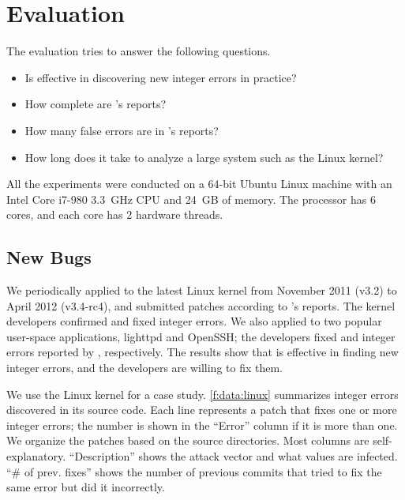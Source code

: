 \section{Evaluation}
\label{s:eval}

The evaluation tries to answer the following questions.
\begin{itemize}
\item
Is \sys effective in discovering new integer errors in practice?
\item
How complete are \sys's reports?
\item
How many false errors are in \sys's reports?
\item
How long does it take \sys to analyze a large system such
as the Linux kernel?
\end{itemize}

All the experiments were conducted on a 64-bit Ubuntu Linux machine
with an Intel Core i7-980 3.3~GHz CPU and 24~GB of memory.  The
processor has 6 cores, and each core has 2 hardware threads.

\subsection{New Bugs}
\label{s:eval:linux}

We periodically applied \sys to the latest Linux kernel
from November 2011 (v3.2) to April 2012 (v3.4-rc4),
and submitted patches according to \sys's reports.
The kernel developers confirmed and fixed \nrbugslinux integer errors.
%
We also applied \sys to two popular user-space applications, lighttpd
and OpenSSH; the developers fixed \nrbugslighttpd and \nrbugsopenssh
integer errors reported by \sys, respectively.
%
The results show that \sys is effective in finding new integer
errors, and the developers are willing to fix them.

We use the Linux kernel for a case study.  \autoref{f:data:linux}
summarizes integer errors \sys discovered in its source code.
Each line represents a patch that fixes one or more integer errors; the
number is shown in the ``Error'' column if it is more than one.  We
organize the patches based on the source directories.  Most
columns are self-explanatory.  ``Description'' shows the attack
vector and what values are infected.  ``\# of prev. fixes'' shows
the number of previous commits that tried to fix the same error but
did it incorrectly. 

